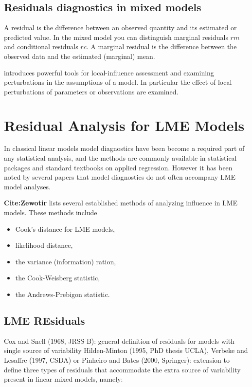 \documentclass[Main.tex]{subfiles}
\begin{document}
	
\subsection{Residuals diagnostics in mixed models}

A residual is the difference between an observed quantity and its estimated or predicted value. In the mixed
model you can distinguish marginal residuals $rm$ and conditional residuals $rc$. A marginal residual is the
difference between the observed data and the estimated (marginal) mean.

\citet{cook86} introduces powerful tools for local-influence
assessment and examining perturbations in the assumptions of a
model. In particular the effect of local perturbations of
parameters or observations are examined.


\section{Residual Analysis for LME Models}

In classical linear models model diagnostics have been become a required part of any statistical analysis, and the methods are commonly available in statistical packages and standard textbooks on applied regression. However it has been noted by several papers that model diagnostics do not often accompany LME model analyses.

\textbf{Cite:Zewotir} lists several established methods of analyzing influence in LME models. These methods include \begin{itemize}
	\item Cook's distance for LME models,
	\item {} likelihood distance,
	\item the variance (information) ration,
	\item the  Cook-Weisberg statistic,
	\item the  Andrews-Prebigon statistic.
\end{itemize}




\subsection{LME REsiduals}	
Cox and Snell (1968, JRSS-B): general definition of residuals for
models with single source of variability
Hilden-Minton (1995, PhD thesis UCLA), Verbeke and Lesaffre
(1997, CSDA) or Pinheiro and Bates (2000, Springer): extension to
define three types of residuals that accommodate the extra source of
variability present in linear mixed models, namely:
\end{document}
